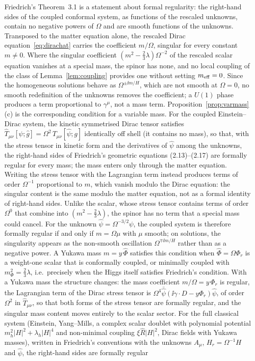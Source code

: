 \begin{remark}
\label{rem:friedrich}
Friedrich's Theorem~3.1 \cite{Friedrich2014} is a statement about formal regularity: the right-hand sides of the coupled conformal system, as functions of the rescaled unknowns, contain no negative powers of $\Omega$ and are smooth functions of the unknowns. Transposed to the matter equation alone, the rescaled Dirac equation~\eqref{eq:dirachat} carries the coefficient $m/\Omega$, singular for every constant $m\neq0$. Where the singular coefficient $(m^{2}-\tfrac23\lambda)\Omega^{-2}$ of the rescaled scalar equation vanishes at a special mass, the spinor has none, and no local coupling of the class of Lemma~\ref{lem:coupling} provides one without setting $m_{\rm eff}=0$. Since the homogeneous solutions behave as $\Omega^{\pm\ii m/H}$, which are not smooth at $\Omega=0$, no smooth redefinition of the unknowns removes the coefficient; a $U(1)$ phase produces a term proportional to $\gamma^{\mu}$, not a mass term. Proposition~\ref{prop:varmass}(c) is the corresponding condition for a variable mass. For the coupled Einstein--Dirac system, the kinetic symmetrised Dirac tensor satisfies $\hat T_{\mu\nu}[\psi;\hat g]=\Omega^{2}\,T_{\mu\nu}[\hat\psi;g]$ identically off shell (it contains no mass), so that, with the stress tensor in kinetic form and the derivatives of $\hat\psi$ among the unknowns, the right-hand sides of Friedrich's geometric equations (2.13)--(2.17) are formally regular for every mass; the mass enters only through the matter equation. Writing the stress tensor with the Lagrangian term instead produces terms of order $\Omega^{-1}$ proportional to $m$, which vanish modulo the Dirac equation: the singular content is the same modulo the matter equation, not as a formal identity of right-hand sides. Unlike the scalar, whose stress tensor contains terms of order $\Omega^{0}$ that combine into $(m^{2}-\tfrac23\lambda)$, the spinor has no term that a special mass could cancel. For the unknown $\hat\psi=\Omega^{-3/2}\psi$, the coupled system is therefore formally regular if and only if $m=\Omega\mu$ with $\mu$ smooth; on solutions, the singularity appears as the non-smooth oscillation $\Omega^{\mp\ii m/H}$ rather than as a negative power. A Yukawa mass $m=y\,\hat\Phi$ satisfies this condition when $\hat\Phi=\Omega\Phi_{r}$ is a weight-one scalar that is conformally coupled, or minimally coupled with $m_{\Phi}^{2}=\tfrac23\lambda$, i.e.\ precisely when the Higgs itself satisfies Friedrich's condition. With a Yukawa mass the structure changes: the mass coefficient $m/\Omega=y\,\Phi_{r}$ is regular, the Lagrangian term of the Dirac stress tensor is $\Omega^{4}\bar{\hat\psi}(\ii\gamma\cdot D-y\Phi_{r})\hat\psi$, of order $\Omega^{2}$ in $\hat T_{\mu\nu}$, so that both forms of the stress tensor are formally regular, and the singular mass content moves entirely to the scalar sector. For the full classical system (Einstein, Yang--Mills, a complex scalar doublet with polynomial potential $m_{h}^{2}|H|^{2}+\lambda_{h}|H|^{4}$ and non-minimal coupling $\xi\hat R|H|^{2}$, Dirac fields with Yukawa masses), written in Friedrich's conventions with the unknowns $A_{\mu}$, $H_{r}=\Omega^{-1}H$ and $\hat\psi$, the right-hand sides are formally regular 
\end{remark}

